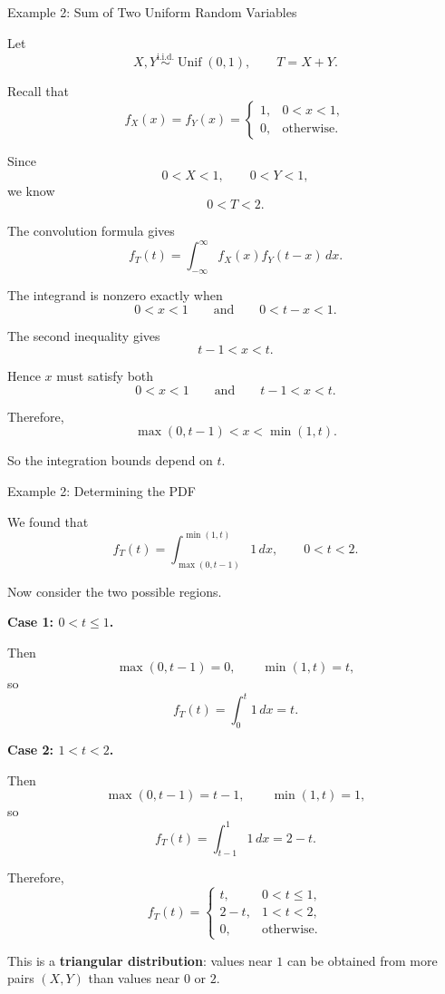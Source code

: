 \begin{frame}{Example 2: Sum of Two Uniform Random Variables}

\small

Let
\[
X,Y\overset{\text{i.i.d.}}{\sim}\operatorname{Unif}(0,1),
\qquad
T=X+Y.
\]

Recall that
\[
f_X(x)=f_Y(x)
=
\begin{cases}
1, & 0<x<1,\\
0, & \text{otherwise}.
\end{cases}
\]

Since
\[
0<X<1,
\qquad
0<Y<1,
\]
we know
\[
0<T<2.
\]

The convolution formula gives
\[
f_T(t)
=
\int_{-\infty}^{\infty}
f_X(x)f_Y(t-x)\,dx.
\]

The integrand is nonzero exactly when
\[
0<x<1
\qquad\text{and}\qquad
0<t-x<1.
\]

The second inequality gives
\[
t-1<x<t.
\]

Hence $x$ must satisfy both
\[
0<x<1
\qquad\text{and}\qquad
t-1<x<t.
\]

Therefore,
\[
\max(0,t-1)<x<\min(1,t).
\]

So the integration bounds depend on $t$.

\end{frame}


\begin{frame}{Example 2: Determining the PDF}

\small

We found that
\[
f_T(t)
=
\int_{\max(0,t-1)}^{\min(1,t)}1\,dx,
\qquad 0<t<2.
\]

Now consider the two possible regions.

\textbf{Case 1: $0<t\le1$.}

Then
\[
\max(0,t-1)=0,
\qquad
\min(1,t)=t,
\]
so
\[
f_T(t)
=
\int_0^t 1\,dx
=
t.
\]

\textbf{Case 2: $1<t<2$.}

Then
\[
\max(0,t-1)=t-1,
\qquad
\min(1,t)=1,
\]
so
\[
f_T(t)
=
\int_{t-1}^1 1\,dx
=
2-t.
\]

Therefore,
\[
f_T(t)
=
\begin{cases}
t, & 0<t\le1,\\[2mm]
2-t, & 1<t<2,\\[2mm]
0, & \text{otherwise}.
\end{cases}
\]

This is a \textbf{triangular distribution}: values near $1$ can be obtained
from more pairs $(X,Y)$ than values near $0$ or $2$.

\end{frame}






 